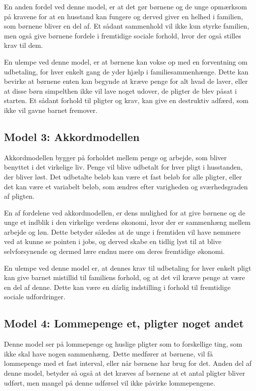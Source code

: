 En anden fordel ved denne model, er at det gør 
børnene og de unge opmærksom på kravene for at 
en husstand kan fungere og derved giver en 
helhed i familien, som børnene bliver en del af. 
Et sådant sammenhold vil ikke kun styrke 
familien, men også give børnene fordele 
i fremtidige sociale forhold, hvor der også 
stilles krav til dem.

En ulempe ved denne model, er at børnene kan 
vokse op med en forventning om udbetaling, for 
hver enkelt gang de yder hjælp i 
familiesammenhænge. Dette kan bevirke at børnene 
enten kan begynde at kræve penge for alt hvad de 
laver, eller at disse børn simpelthen ikke vil 
lave noget udover, de pligter de blev påsat i 
starten. Et sådant forhold til pligter og krav, 
kan give en destruktiv adfærd, som ikke vil 
gavne barnet fremover.

\subsection{Model 3: Akkordmodellen}
Akkordmodellen bygger på forholdet mellem penge 
og arbejde, som bliver benyttet i det 
virkelige liv. Penge vil blive udbetalt for 
hver pligt i husstanden, der bliver løst. 
Det udbetalte beløb kan være et fast beløb 
for alle pligter, eller det kan være et 
variabelt beløb, som ændres efter varigheden
og sværhedsgraden af pligten.

En af fordelene ved akkordmodellen, er dens 
mulighed for at give børnene og de unge et 
indblik i den virkelige verdens økonomi, hvor 
der er sammenhæng mellem arbejde og løn. Dette 
betyder således at de unge i fremtiden vil have 
nemmere ved at kunne se pointen i jobs, og 
derved skabe en tidlig lyst til at blive 
selvforsynende og dermed lære endnu mere om 
deres fremtidige økonomi.

En ulempe ved denne model er, at dennes krav til 
udbetaling for hver enkelt pligt kan give 
barnet mistillid til familiens forhold, og at 
det vil kræve penge at være en del af denne. 
Dette kan være en dårlig indstilling i forhold til 
fremtidige sociale udfordringer.

\subsection{Model 4: Lommepenge et, pligter 
noget andet}
Denne model ser på lommepenge og huslige pligter 
som to forskellige ting, som ikke skal have 
nogen sammenhæng. Dette medfører at 
børnene, vil få lommepenge med et fast interval, 
eller når børnene har brug for det. Anden del af 
denne model, betyder så også at det kræves af 
børnene at et antal pligter bliver udført, men 
mangel på denne udførsel vil ikke påvirke 
lommepengene.

